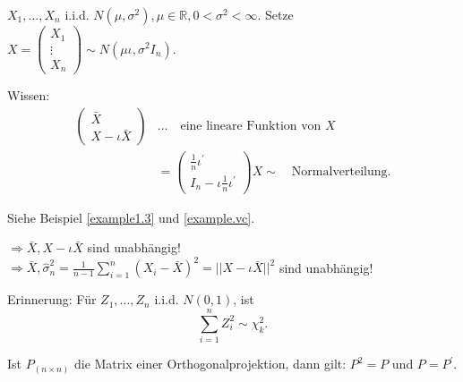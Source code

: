\documentclass{tstextbook}
\newcommand{\R}{\mathbb R}
\begin{document}
\begin{example}
	$ X_1, \ldots, X_n $ i.i.d. $ N(\mu, \sigma^2), \mu \in \R, 0 < \sigma^2 < \infty $.
	Setze $ X = \begin{pmatrix}
		X_1 \\ \vdots \\ X_n
	\end{pmatrix} \sim N(\mu\iota, \sigma^2 I_n) $.

	Wissen:  
	\[
	\begin{aligned}
	\begin{pmatrix}
		\bar{X} \\ X- \iota \bar{X}
	\end{pmatrix} & \ldots \quad \text{eine lineare Funktion von } X \\
	& = \begin{pmatrix}
		\frac{1}{n} \iota^\prime \\ I_n - \iota \frac{1}{n} \iota^\prime
	\end{pmatrix} X \sim \quad \text{Normalverteilung.}
	\end{aligned}
	\] 
	
	Siehe Beispiel \href{example1.3}{\ref{example1.3}} und \href{example.vc}{\ref{example.vc}}.
	
	$ \Rightarrow \bar{X}, X-\iota\bar{X} $ sind unabhängig!\\
	$ \Rightarrow \bar{X}, \hat{\sigma}_n^2 = \frac{1}{n-1} \sum_{i=1}^{n} (X_i-\bar{X})^2 =  ||X-\iota\bar{X}||^2 $ sind unabhängig!
\end{example}

\begin{remark}
	Erinnerung: Für $ Z_1, \ldots, Z_n $ i.i.d. $ N(0,1) $, ist 
	\[
	\sum_{i=1}^{n} Z_i^2 \sim \chi_k^2.
	\]
\end{remark}
\begin{lemma}
	Ist $ P_{(n \times n)} $ die Matrix einer Orthogonalprojektion, dann gilt: $ P^2=P $  und $ P=P^\prime $.
\end{lemma}
\end{document}
